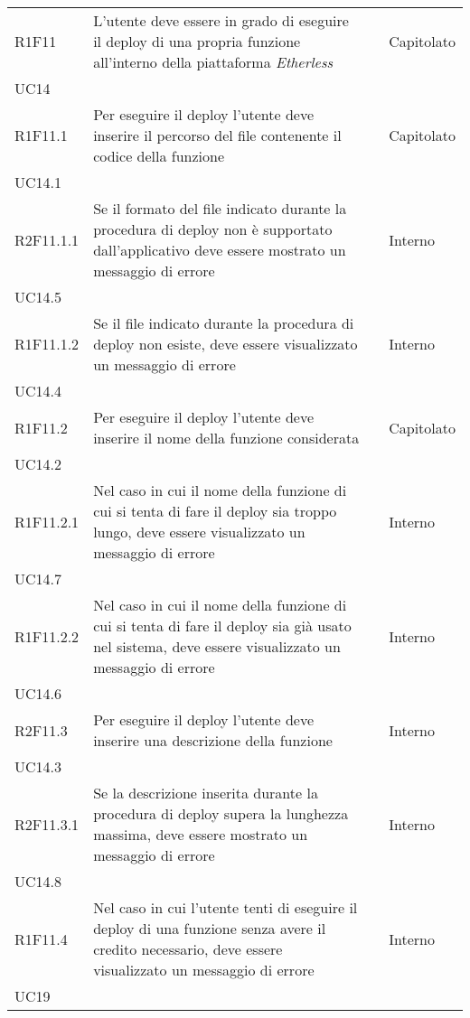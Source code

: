 \begin{longtable}{ 
		>{\centering}p{} 
		>{}p{} 
		>{\centering}p{}
		>{\centering}p{} }
	R1F11 & L'utente deve essere in grado di eseguire il deploy di una propria
		funzione all'interno della piattaforma \textit{Etherless} 					& \ob & Capitolato \\ UC14 \tabularnewline
	R1F11.1 & Per eseguire il deploy l'utente deve inserire il percorso del file 
		contenente il codice della funzione 										& \ob & Capitolato \\ UC14.1 \tabularnewline
	R2F11.1.1 & Se il formato del file indicato durante la procedura di deploy
		non è supportato dall'applicativo deve essere mostrato un messaggio di 
		errore																		& \de & Interno \\ UC14.5 \tabularnewline
	R1F11.1.2 & Se il file indicato durante la procedura di deploy non esiste, 
		deve essere visualizzato un messaggio di errore								& \ob & Interno \\ UC14.4 \tabularnewline
	R1F11.2 & Per eseguire il deploy l'utente deve inserire il nome della 
		funzione considerata 														& \ob & Capitolato \\ UC14.2 \tabularnewline
	R1F11.2.1 & Nel caso in cui il nome della funzione di cui si tenta di fare 
		il deploy sia troppo lungo, deve essere visualizzato un messaggio di errore & \ob & Interno \\ UC14.7 \tabularnewline
	R1F11.2.2 & Nel caso in cui il nome della funzione di cui si tenta di fare 
		il deploy sia già usato nel sistema, deve essere visualizzato un messaggio 
		di errore																	& \ob & Interno \\ UC14.6 \tabularnewline
	R2F11.3 & Per eseguire il deploy l'utente deve inserire una descrizione 
		della funzione 																& \de & Interno \\ UC14.3  \tabularnewline
	R2F11.3.1 & Se la descrizione inserita durante la procedura di deploy supera la 
		lunghezza massima, deve essere mostrato un messaggio di errore 				& \de & Interno \\ UC14.8  \tabularnewline
	R1F11.4 & Nel caso in cui l'utente tenti di eseguire il deploy di una funzione
		senza avere il credito necessario, deve essere visualizzato un messaggio 
		di errore & \ob & Interno \\ UC19 \tabularnewline


\end{longtable}

